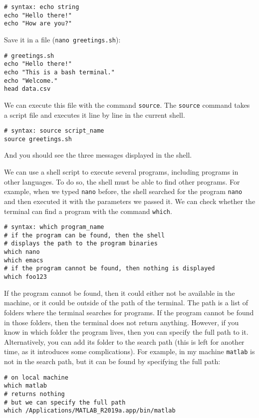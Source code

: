 \documentclass[12pt, a4paper]{article}
\begin{document}
\lstset{language=bash,label= ,caption= ,captionpos=b,firstnumber=1,numbers=left,style=bash}
\begin{lstlisting}
# syntax: echo string
echo "Hello there!"
echo "How are you?"
\end{lstlisting}
Save it in a file (\texttt{nano greetings.sh}):

\lstset{language=bash,label= ,caption= ,captionpos=b,firstnumber=1,numbers=left,style=bash}
\begin{lstlisting}
# greetings.sh
echo "Hello there!"
echo "This is a bash terminal."
echo "Welcome."
head data.csv
\end{lstlisting}

We can execute this file with the command \texttt{source}.
The \texttt{source} command takes a script file and executes it line by line in the current shell.
\lstset{language=bash,label= ,caption= ,captionpos=b,firstnumber=1,numbers=left,style=bash}
\begin{lstlisting}
# syntax: source script_name
source greetings.sh
\end{lstlisting}
And you should see the three messages displayed in the shell.

We can use a shell script to execute several programs, including programs in other languages.
To do so, the shell must be able to find other programs.
For example, when we typed \texttt{nano} before, the shell searched for the program \texttt{nano} and then executed it with the parameters we passed it.
We can check whether the terminal can find a program with the command \texttt{which}.
\lstset{language=bash,label= ,caption= ,captionpos=b,firstnumber=1,numbers=left,style=bash}
\begin{lstlisting}
# syntax: which program_name
# if the program can be found, then the shell
# displays the path to the program binaries
which nano
which emacs
# if the program cannot be found, then nothing is displayed
which foo123
\end{lstlisting}
If the program cannot be found, then it could either not be available in the machine, or it could be outside of the path of the terminal.
The path is a list of folders where the terminal searches for programs.
If the program cannot be found in those folders, then the terminal does not return anything.
However, if you know in which folder the program lives, then you can specify the full path to it.
Alternatively, you can add its folder to the search path (this is left for another time, as it introduces some complications).
For example, in my machine \texttt{matlab} is not in the search path, but it can be found by specifying the full path:
\lstset{language=bash,label= ,caption= ,captionpos=b,firstnumber=1,numbers=left,style=bash}
\begin{lstlisting}
# on local machine
which matlab
# returns nothing
# but we can specify the full path
which /Applications/MATLAB_R2019a.app/bin/matlab
\end{lstlisting}
\end{document}
